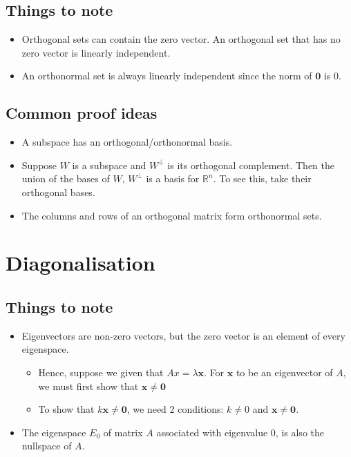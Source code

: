 \documentclass{article}
\begin{document}
\subsection{Things to note}
\begin{itemize}
	\item Orthogonal sets can contain the zero vector. An orthogonal set that has no zero vector is linearly independent.
	\item An orthonormal set is always linearly independent since the norm of $\mathbf{0}$ is $0$.
\end{itemize}

\subsection{Common proof ideas}
\begin{itemize}
	\item A subspace has an orthogonal/orthonormal basis.
	\item Suppose $W$ is a subspace and $W^{\perp}$ is its orthogonal complement. Then the union of the bases of $W$, $W^\perp$ is a basis for $\mathbb{R}^n$. To see this, take their orthogonal bases.
	\item The columns and rows of an orthogonal matrix form orthonormal sets.
\end{itemize}

\section{Diagonalisation}
\subsection{Things to note}
\begin{itemize}
	\item Eigenvectors are non-zero vectors, but the zero vector is an element of every eigenspace.
	\begin{itemize}
		\item Hence, suppose we given that $Ax=\lambda \mathbf{x}$. For $\mathbf{x}$ to be an eigenvector of $A$, we must first show that $\mathbf{x}\neq \mathbf{0}$
		\item To show that $k\mathbf{x}\neq \mathbf{0}$, we need 2 conditions: $k\neq 0$ and $\mathbf{x}\neq \mathbf{0}$.
	\end{itemize}
	\item The eigenspace $E_0$ of matrix $A$ associated with eigenvalue $0$, is also the nullspace of $A$.
\end{itemize}
\end{document}
